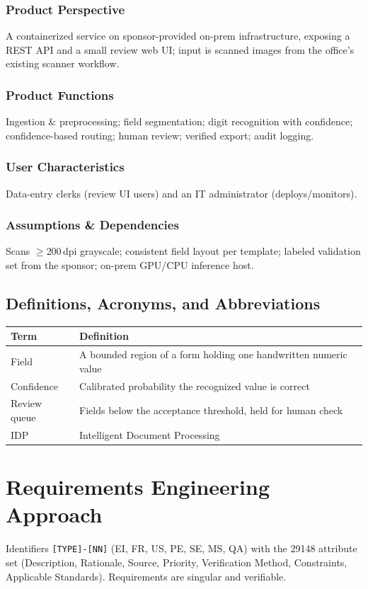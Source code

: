 \documentclass[11pt,letterpaper]{article}
\begin{document}
\subsubsection{Product Perspective}
A containerized service on sponsor-provided on-prem infrastructure, exposing a REST
API and a small review web UI; input is scanned images from the office's existing
scanner workflow. \subsubsection{Product Functions}
Ingestion \& preprocessing; field segmentation; digit recognition with confidence;
confidence-based routing; human review; verified export; audit logging.
\subsubsection{User Characteristics}
Data-entry clerks (review UI users) and an IT administrator (deploys/monitors).
\subsubsection{Assumptions \& Dependencies}
Scans $\geq$200\,dpi grayscale; consistent field layout per template; labeled
validation set from the sponsor; on-prem GPU/CPU inference host.
\subsection{Definitions, Acronyms, and Abbreviations}
\begin{table}[H]\begin{center}\begin{tabular}{ | p{3cm} | p{10cm} |}\hline
\textbf{Term} & \textbf{Definition} \\ \hline
Field & A bounded region of a form holding one handwritten numeric value \\ \hline
Confidence & Calibrated probability the recognized value is correct \\ \hline
Review queue & Fields below the acceptance threshold, held for human check \\ \hline
IDP & Intelligent Document Processing \\ \hline
\end{tabular}\end{center}\end{table}
\newpage

\section{Requirements Engineering Approach}
Identifiers \texttt{[TYPE]-[NN]} (EI, FR, US, PE, SE, MS, QA) with the 29148
attribute set (Description, Rationale, Source, Priority, Verification Method,
Constraints, Applicable Standards). Requirements are singular and verifiable.
\newpage
\end{document}
